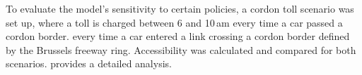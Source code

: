 To evaluate the model's sensitivity to certain policies, a cordon toll scenario was set up, where a toll is charged between 6 and 10\,am every time a car passed a cordon border. \ie every time a car entered a link crossing a cordon border defined by the Brussels freeway ring. Accessibility was calculated and compared for both scenarios.  \citet{RoederNagel2013SketchPlanningBrussels} provides a detailed analysis.

